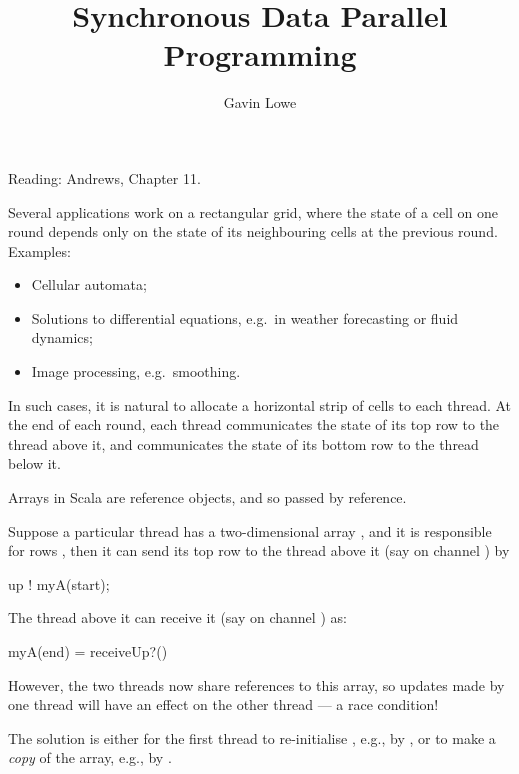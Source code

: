 \documentclass[notes,color]{sepslide0}
\title{Synchronous Data Parallel Programming}
\author{Gavin Lowe}
\begin{document}
\begin{slide}
  
  \Title

Reading: Andrews, Chapter 11.
\end{slide}





\begin{slide}

Several applications work on a rectangular grid, where the state of a cell on
one round depends only on the state of its neighbouring cells at the previous
round.  Examples:
%
\begin{itemize}
\item
Cellular automata;

\item
Solutions to differential equations, e.g.~in weather forecasting or fluid
dynamics;

\item Image processing, e.g.~smoothing.
\end{itemize}

In such cases, it is natural to allocate a horizontal strip of cells to each
thread.  At the end of each round, each thread communicates the state of its
top row to the thread above it, and communicates the state of its bottom row
to the thread below it.  

\end{slide}


\begin{slide}

Arrays in Scala are reference objects, and so passed by reference.  

Suppose a particular thread has a two-dimensional array , and it
is responsible for rows \SCALA{[start..end)}, then it can send its top row to
the thread above it (say on channel ) by
%
\begin{scala}
up ! myA(start);
\end{scala}
%
The thread above it can receive it (say on channel ) as:
%
\begin{scala}
myA(end) = receiveUp?()
\end{scala}
%
However, the two threads now share references to this array, so updates made
by one thread will have an effect on the other thread --- a race condition!

The solution is either for the first thread to re-initialise
, e.g., by , or to
make a \emph{copy} of the array, e.g., by .
\end{slide}
\end{document}
